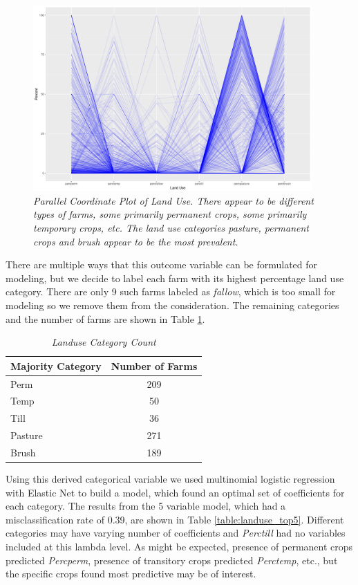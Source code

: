 \documentclass{article}
\begin{document}
\begin{figure}[h!]
\centering
\includegraphics[width = 0.95\textwidth]{landuse_parplot.pdf}
\caption{\textsl{\small Parallel Coordinate Plot of Land Use. There appear to be different types of farms, some primarily permanent crops, some primarily temporary crops, etc. The land use categories pasture, permanent crops and brush appear to be the most prevalent.}}
\label{figure:landuse_plot}
\end{figure}

There are multiple ways that this outcome variable can be formulated for modeling, but we decide to label each farm with its 
highest percentage land use category. There are only 9 such farms labeled as \textit{fallow}, which is too small for modeling so we 
remove them from the consideration. The remaining categories and the number of farms are shown in Table \ref{table:landuse_cat}.

\begin{table}[h]
\centering
\begin{tabular}{lc}
Majority Category    & Number of Farms \\
\hline
Perm    & 209             \\
Temp    & 50              \\
Till    & 36              \\
Pasture & 271             \\
Brush   & 189            
\end{tabular}
\caption{\textsl{\small Landuse Category Count}}
\label{table:landuse_cat}
\end{table}  	

Using this derived categorical variable we used multinomial logistic regression with Elastic Net to build a model, which found an 
optimal set of coefficients for each category. The results from the 5 variable model, which had a misclassification rate of 0.39, 
are shown in Table \ref{table:landuse_top5}. Different categories may have varying number of coefficients and \textit{Perctill} 
had no variables included at this lambda level. As might be expected, presence of permanent crops predicted \textit{Percperm}, 
presence of transitory crops predicted \textit{Perctemp}, etc., but the specific crops found most predictive may be of interest.
\end{document}
